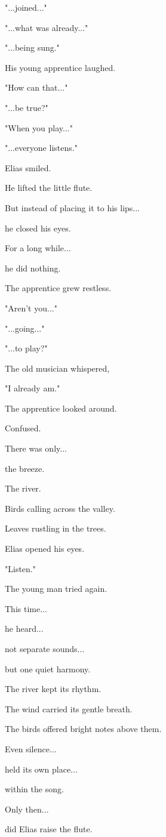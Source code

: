 \documentclass[12pt,openany]{book}
\begin{document}
"...joined..."

"...what was already..."

"...being sung."

His young apprentice laughed.

"How can that..."

"...be true?"

"When you play..."

"...everyone listens."

Elias smiled.

He lifted the little flute.

But instead of placing it to his lips...

he closed his eyes.

For a long while...

he did nothing.

The apprentice grew restless.

"Aren't you..."

"...going..."

"...to play?"

The old musician whispered,

"I already am."

The apprentice looked around.

Confused.

There was only...

the breeze.

The river.

Birds calling across the valley.

Leaves rustling in the trees.

Elias opened his eyes.

"Listen."

The young man tried again.

This time...

he heard...

not separate sounds...

but one quiet harmony.

The river kept its rhythm.

The wind carried its gentle breath.

The birds offered bright notes above them.

Even silence...

held its own place...

within the song.

Only then...

did Elias raise the flute.
\end{document}
